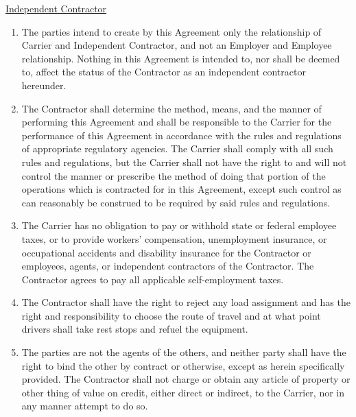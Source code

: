 \underline{Independent Contractor}
\begin{enumerate}
    \item The parties intend to create by this Agreement only the
    relationship of Carrier and Independent Contractor, and not an Employer
    and Employee relationship. Nothing in this Agreement is intended to,
    nor shall be deemed to, affect the status of the Contractor as an
    independent contractor hereunder.

    \item The Contractor shall determine the method, means, and the manner
    of performing this Agreement and shall be responsible to the Carrier
    for the performance of this Agreement in accordance with the rules and
    regulations of appropriate regulatory agencies. The Carrier shall
    comply with all such rules and regulations, but the Carrier shall not
    have the right to and will not control the manner or prescribe the
    method of doing that portion of the operations which is contracted for
    in this Agreement, except such control as can reasonably be construed
    to be required by said rules and regulations.

    \item The Carrier has no obligation to pay or withhold state or federal
    employee taxes, or to provide workers' compensation, unemployment
    insurance, or occupational accidents and disability insurance for the
    Contractor or employees, agents, or independent contractors of the
    Contractor. The Contractor agrees to pay all applicable self-employment
    taxes.

    \item The Contractor shall have the right to reject any load assignment
    and has the right and responsibility to choose the route of travel and
    at what point drivers shall take rest stops and refuel the equipment.

    \item The parties are not the agents of the others, and neither party
    shall have the right to bind the other by contract or otherwise, except
    as herein specifically provided. The Contractor shall not charge or
    obtain any article of property or other thing of value on credit,
    either direct or indirect, to the Carrier, nor in any manner attempt to
    do so.
\end{enumerate}